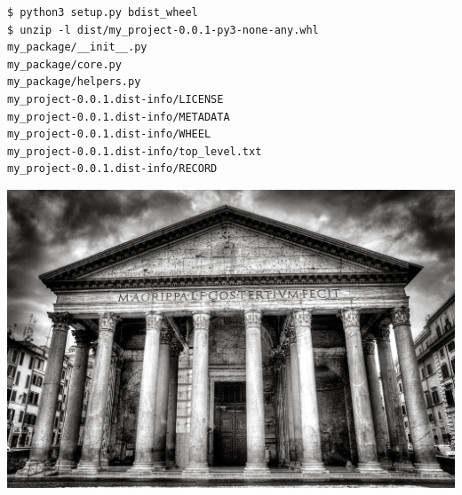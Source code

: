 \documentclass[pdf]{beamer}
\begin{document}
\begin{frame}[fragile]
    \begin{verbatim}
$ python3 setup.py bdist_wheel
$ unzip -l dist/my_project-0.0.1-py3-none-any.whl
my_package/__init__.py
my_package/core.py
my_package/helpers.py
my_project-0.0.1.dist-info/LICENSE
my_project-0.0.1.dist-info/METADATA
my_project-0.0.1.dist-info/WHEEL
my_project-0.0.1.dist-info/top_level.txt
my_project-0.0.1.dist-info/RECORD
    \end{verbatim}
\end{frame}

\begin{frame}

\end{frame}

\begin{frame}
    \includegraphics[width=\textwidth]{img/pantheon.jpeg}
\end{frame}
\end{document}
